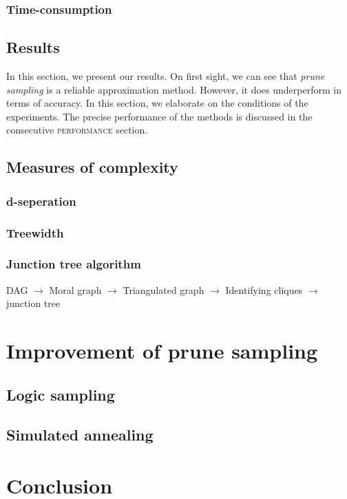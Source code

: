 \documentclass[a4paper, twoside, 11pt]{report}
\theoremstyle{plain}
\theoremstyle{definition}
\theoremstyle{remark}
\begin{document}
\subsection{Time-consumption}

\section{Results}
In this section, we present our results. On first sight, we can see that \textit{prune sampling} is a reliable approximation method. However, it does underperform in terms of accuracy. In this section, we elaborate on the conditions of the experiments. The precise performance of the methods is discussed in the consecutive {\normalfont\scshape \sffamily performance} section. 


\section{Measures of complexity}
\subsection{d-seperation}
\subsection{Treewidth}
\subsection{Junction tree algorithm}
DAG $\rightarrow$ Moral graph $\rightarrow$ Triangulated graph $\rightarrow$ Identifying cliques $\rightarrow$ junction tree


\chapter{Improvement of prune sampling}
\section{Logic sampling}
\section{Simulated annealing}

\chapter{Conclusion}


\clearpage




%
%
\end{document}
